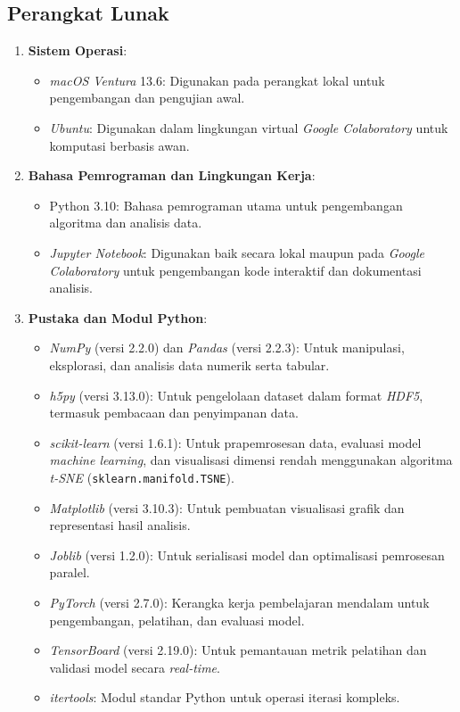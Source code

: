 \subsection{Perangkat Lunak}
\begin{enumerate}
  \item \textbf{Sistem Operasi}:
  \begin{itemize}
    \item \textit{macOS Ventura} 13.6: Digunakan pada perangkat lokal untuk pengembangan dan pengujian awal.
    \item \textit{Ubuntu}: Digunakan dalam lingkungan virtual \textit{Google Colaboratory} untuk komputasi berbasis awan.
  \end{itemize}
  
  \item \textbf{Bahasa Pemrograman dan Lingkungan Kerja}:
  \begin{itemize}
    \item Python 3.10: Bahasa pemrograman utama untuk pengembangan algoritma dan analisis data.
    \item \textit{Jupyter Notebook}: Digunakan baik secara lokal maupun pada \textit{Google Colaboratory} untuk pengembangan kode interaktif dan dokumentasi analisis.
  \end{itemize}
  
  \item \textbf{Pustaka dan Modul Python}:
  \begin{itemize}
    \item \textit{NumPy} (versi 2.2.0) dan \textit{Pandas} (versi 2.2.3): Untuk manipulasi, eksplorasi, dan analisis data numerik serta tabular.
    \item \textit{h5py} (versi 3.13.0): Untuk pengelolaan dataset dalam format \textit{HDF5}, termasuk pembacaan dan penyimpanan data.
    \item \textit{scikit-learn} (versi 1.6.1): Untuk prapemrosesan data, evaluasi model \textit{machine learning}, dan visualisasi dimensi rendah menggunakan algoritma \textit{t-SNE} (\texttt{sklearn.manifold.TSNE}).
    \item \textit{Matplotlib} (versi 3.10.3): Untuk pembuatan visualisasi grafik dan representasi hasil analisis.
    \item \textit{Joblib} (versi 1.2.0): Untuk serialisasi model dan optimalisasi pemrosesan paralel.
    \item \textit{PyTorch} (versi 2.7.0): Kerangka kerja pembelajaran mendalam untuk pengembangan, pelatihan, dan evaluasi model.
    \item \textit{TensorBoard} (versi 2.19.0): Untuk pemantauan metrik pelatihan dan validasi model secara \textit{real-time}.
    \item \textit{itertools}: Modul standar Python untuk operasi iterasi kompleks.
  \end{itemize}
\end{enumerate}

